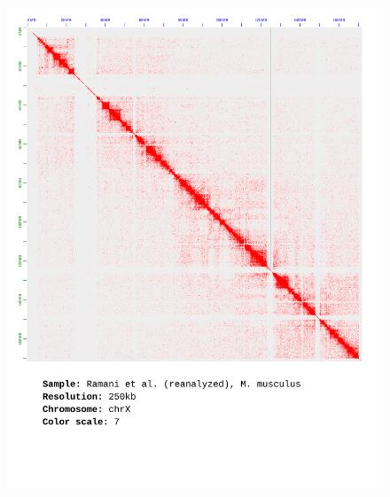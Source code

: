 \documentclass[a4paper,14pt]{extarticle}
\begin{document}
\begin{figure}[hp!] \includegraphics[width=1\textwidth]{ramani-brain_chrX_500-100kb_7.pdf} \end{figure}
\end{document}
